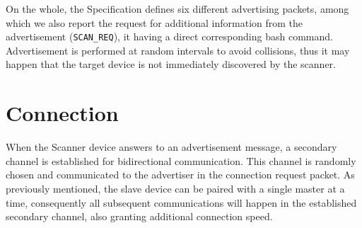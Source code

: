 On the whole, the Specification defines six different advertising packets, among which we also report the request for additional information from the advertisement (\texttt{SCAN\_REQ}), it having a direct corresponding bash command. Advertisement is performed at random intervals to avoid collisions, thus it may happen that the target device is not immediately discovered by the scanner.

\section{Connection}
When the Scanner device answers to an advertisement message, a secondary channel is established for bidirectional communication. This channel is randomly chosen and communicated to the advertiser in the connection request packet. As previously mentioned, the slave device can be paired with a single master at a time, consequently all subsequent communications will happen in the established secondary channel, also granting additional connection speed.

